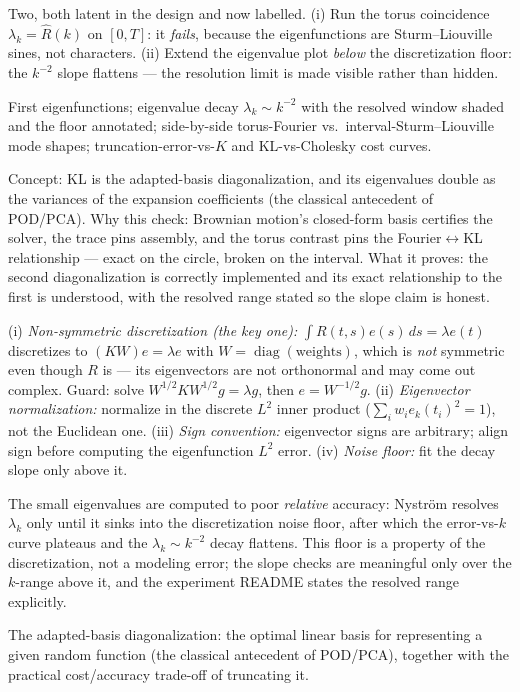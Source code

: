 \documentclass[11pt]{article}
\newenvironment{unitmeta}{%
  \begin{description}[style=sameline,leftmargin=1.4cm,font=\bfseries\color{hubblue}]
}{%
  \end{description}
}
\begin{document}
\begin{unitmeta}
\item[Negative control] Two, both latent in the design and now labelled. (i) Run the torus coincidence $\lambda_k=\hat R(k)$ on $[0,T]$: it \emph{fails}, because the eigenfunctions are Sturm--Liouville sines, not characters. (ii) Extend the eigenvalue plot \emph{below} the discretization floor: the $k^{-2}$ slope flattens --- the resolution limit is made visible rather than hidden.
\item[Artifact] First eigenfunctions; eigenvalue decay $\lambda_k \sim k^{-2}$ with the resolved window shaded and the floor annotated; side-by-side torus-Fourier vs.\ interval-Sturm--Liouville mode shapes; truncation-error-vs-$K$ and KL-vs-Cholesky cost curves.
\item[README] Concept: KL is the adapted-basis diagonalization, and its eigenvalues double as the variances of the expansion coefficients (the classical antecedent of POD/PCA). Why this check: Brownian motion's closed-form basis certifies the solver, the trace pins assembly, and the torus contrast pins the Fourier$\leftrightarrow$KL relationship --- exact on the circle, broken on the interval. What it proves: the second diagonalization is correctly implemented and its exact relationship to the first is understood, with the resolved range stated so the slope claim is honest.
\item[Missteps] (i) \emph{Non-symmetric discretization (the key one):} $\int R(t,s)e(s)\,ds=\lambda e(t)$ discretizes to $(KW)e=\lambda e$ with $W=\operatorname{diag}(\text{weights})$, which is \emph{not} symmetric even though $R$ is --- its eigenvectors are not orthonormal and may come out complex. Guard: solve $W^{1/2}KW^{1/2}g=\lambda g$, then $e=W^{-1/2}g$. (ii) \emph{Eigenvector normalization:} normalize in the discrete $L^2$ inner product ($\sum_i w_i e_k(t_i)^2=1$), not the Euclidean one. (iii) \emph{Sign convention:} eigenvector signs are arbitrary; align sign before computing the eigenfunction $L^2$ error. (iv) \emph{Noise floor:} fit the decay slope only above it.
\item[Numerical caution] The small eigenvalues are computed to poor \emph{relative} accuracy: Nystr\"om resolves $\lambda_k$ only until it sinks into the discretization noise floor, after which the error-vs-$k$ curve plateaus and the $\lambda_k\sim k^{-2}$ decay flattens. This floor is a property of the discretization, not a modeling error; the slope checks are meaningful only over the $k$-range above it, and the experiment README states the resolved range explicitly.
\item[Purpose] The adapted-basis diagonalization: the optimal linear basis for representing a given random function (the classical antecedent of POD/PCA), together with the practical cost/accuracy trade-off of truncating it.

\end{unitmeta}
\end{document}
